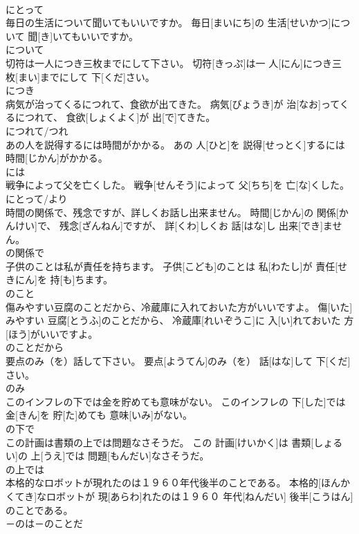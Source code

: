 \documentclass[8pt]{extreport}
\begin{document}
\begin{CJK}{UTF8}{min}
\\	にとって	
\\	毎日の生活について聞いてもいいですか。	毎日[まいにち]の 生活[せいかつ]について 聞[き]いてもいいですか。	
\\	について	
\\	切符は一人につき三枚までにして下さい。	切符[きっぷ]は一 人[にん]につき三 枚[まい]までにして 下[くだ]さい。	
\\	につき	
\\	病気が治ってくるにつれて、食欲が出てきた。	病気[びょうき]が 治[なお]ってくるにつれて、 食欲[しょくよく]が 出[で]てきた。	
\\	につれて/つれ	
\\	あの人を説得するには時間がかかる。	あの 人[ひと]を 説得[せっとく]するには 時間[じかん]がかかる。	
\\	には	
\\	戦争によって父を亡くした。	戦争[せんそう]によって 父[ちち]を 亡[な]くした。	
\\	にとって/より	
\\	時間の関係で、残念ですが、詳しくお話し出来ません。	時間[じかん]の 関係[かんけい]で、 残念[ざんねん]ですが、 詳[くわ]しくお 話[はな]し 出来[でき]ません。	
\\	の関係で	
\\	子供のことは私が責任を持ちます。	子供[こども]のことは 私[わたし]が 責任[せきにん]を 持[も]ちます。	
\\	のこと	
\\	傷みやすい豆腐のことだから、冷蔵庫に入れておいた方がいいですよ。	傷[いた]みやすい 豆腐[とうふ]のことだから、 冷蔵庫[れいぞうこ]に 入[い]れておいた 方[ほう]がいいですよ。	
\\	のことだから	
\\	要点のみ（を）話して下さい。	要点[ようてん]のみ（を） 話[はな]して 下[くだ]さい。	
\\	のみ	
\\	このインフレの下では金を貯めても意味がない。	このインフレの 下[した]では 金[きん]を 貯[た]めても 意味[いみ]がない。	
\\	の下で	
\\	この計画は書類の上では問題なさそうだ。	この 計画[けいかく]は 書類[しょるい]の 上[うえ]では 問題[もんだい]なさそうだ。	
\\	の上では	
\\	本格的なロボットが現れたのは１９６０年代後半のことである。	本格的[ほんかくてき]なロボットが 現[あらわ]れたのは１９６０ 年代[ねんだい] 後半[こうはん]のことである。	
\\	－のは－のことだ	

\end{CJK}
\end{document}
